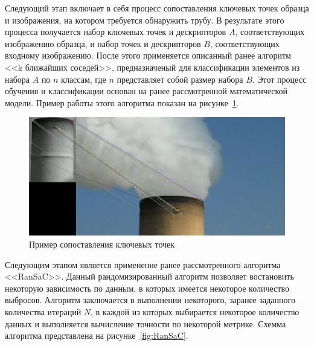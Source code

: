 \documentclass[14pt, a4paper]{extreport}
\begin{document}
	Следующий этап включает в себя процесс сопоставления ключевых точек образца и изображения, на котором требуется обнаружить трубу. В результате этого процесса получается набор ключевых точек и дескрипторов $A$, соответствующих изображению образца, и набор точек и дескрипторов $B$, соответствующих входному изображению. После этого применяется описанный ранее алгоритм <<k ближайших соседей>>, предназначеный для классификации элементов из набора $A$ по $n$ классам, где $n$ представляет собой размер набора $B$. Этот процесс обучения и классификации основан на ранее рассмотренной математической модели. Пример работы этого алгоритма показан на рисунке~\ref{fig:match1}.
	
	\begin{figure}[h!]
		\centering
		\includegraphics[width = \textwidth]{image/chapter_2/match1}	
		\caption{Пример сопоставления ключевых точек}
		\label{fig:match1}
	\end{figure}

	Следующим этапом является применение ранее рассмотренного алгоритма <<RanSaC>>. Данный рандомизированный алгоритм позволяет востановить некоторую зависимость по данным, в которых имеется некоторое количество выбросов. Алгоритм заключается в выполнении некоторого, заранее заданного количества итераций $N$, в каждой из которых выбирается некоторое количество данных и выполняется вычисление точности по некоторой метрике. Схемма алгоритма представлена на рисунке~\ref{fig:RanSaC}.
	
\end{document}
